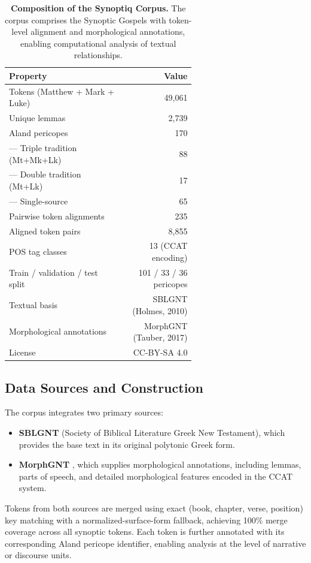\documentclass[11pt,letterpaper]{article}
\newcommand{\tblhead}{\rowcolor{marine!12}}
\begin{document}
\begin{table}[H]
\centering
\begin{tabular}{L{0.62\linewidth}r}
\toprule
\tblhead\textbf{Property} & \textbf{Value} \\
\midrule
Tokens (Matthew + Mark + Luke) & 49,061 \\
Unique lemmas & 2,739 \\
Aland pericopes & 170 \\
\quad--- Triple tradition (Mt+Mk+Lk) & 88 \\
\quad--- Double tradition (Mt+Lk) & 17 \\
\quad--- Single-source & 65 \\
Pairwise token alignments & 235 \\
Aligned token pairs & 8,855 \\
POS tag classes & 13 (CCAT encoding) \\
Train / validation / test split & 101 / 33 / 36 pericopes \\
Textual basis & SBLGNT (Holmes, 2010) \\
Morphological annotations & MorphGNT (Tauber, 2017) \\
License & CC-BY-SA 4.0 \\
\bottomrule
\end{tabular}
\caption{\textbf{Composition of the Synoptiq Corpus.} The corpus comprises the Synoptic Gospels with token-level alignment and morphological annotations, enabling computational analysis of textual relationships.}
\label{tab:corpus}
\end{table}

\subsection{Data Sources and Construction}

The corpus integrates two primary sources:
\begin{itemize}
    \item \textbf{SBLGNT} (Society of Biblical Literature Greek New Testament), which provides the base text in its original polytonic Greek form.
    \item \textbf{MorphGNT} \citep{tauber2017}, which supplies morphological annotations, including lemmas, parts of speech, and detailed morphological features encoded in the CCAT system.
\end{itemize}

Tokens from both sources are merged using exact (book, chapter, verse, position) key matching with a normalized-surface-form fallback, achieving 100\% merge coverage across all synoptic tokens. Each token is further annotated with its corresponding Aland pericope identifier, enabling analysis at the level of narrative or discourse units.
\end{document}
